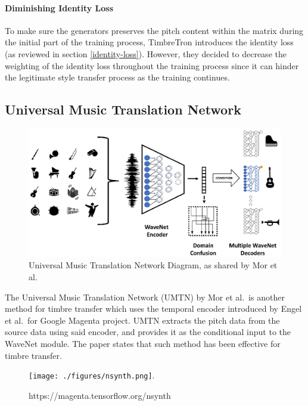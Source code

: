 \documentclass[]{report}
\begin{document}
\paragraph{Diminishing Identity Loss}

To make sure the generators preserves the pitch content within the
matrix during the initial part of the training process, TimbreTron
introduces the identity loss (as reviewed in section
\ref{identity-loss}). However, they decided to decrease the weighting of
the identity loss throughout the training process since it can hinder
the legitimate style transfer process as the training continues.

\hypertarget{universal-music-translation-network}{%
\subsection{Universal Music Translation
Network}\label{universal-music-translation-network}}

\begin{figure}[h]
    \includegraphics[width=\textwidth]{figures/facebook_umtn.eps}
    \centering
    \caption{Universal Music Translation Network Diagram, as shared by Mor et al. \label{fig:facebook_umtn}}
\end{figure}

The Universal Music Translation Network (UMTN) by Mor et al.~is another
method for timbre transfer which uses the temporal encoder introduced by
Engel et al.~for Google Magenta project. UMTN extracts the pitch data
from the source data using said encoder, and provides it as the
conditional input to the WaveNet module. The paper states that such
method has been effective for timbre transfer.

\begin{figure}[h]
    \texttt{[image: ./figures/nsynth.png]}.
    \centering
    \caption{https://magenta.tensorflow.org/nsynth \label{fig:nsynth}}
\end{figure}
\end{document}
